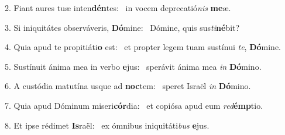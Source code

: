 2. Fiant aures tuæ inten\textbf{dén}tes: \ast\  in vocem deprecatió\textit{nis} \textbf{me}æ.\

3. Si iniquitátes observáveris, \textbf{Dó}mine: \ast\  Dómine, quis sus\textit{ti}\textbf{né}bit?\

4. Quia apud te propitiáti\textbf{o} est: \ast\  et propter legem tuam sustínui \textit{te}, \textbf{Dó}mine.\

5. Sustínuit ánima mea in verbo \textbf{e}jus: \ast\  sperávit ánima mea \textit{in} \textbf{Dó}mino.\

6. A custódia matutína usque ad \textbf{noc}tem: \ast\  speret Israël \textit{in} \textbf{Dó}mino.\

7. Quia apud Dóminum miseri\textbf{cór}dia: \ast\  et copiósa apud eum \textit{red}\textbf{émp}tio.\

8. Et ipse rédimet \textbf{Is}raël: \ast\  ex ómnibus iniquitáti\textit{bus} \textbf{e}jus.\

